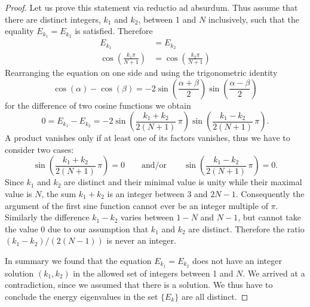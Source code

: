 \documentclass[a4paper,10pt]{article}
\begin{document}
\begin{proof}
    Let us prove this statement via reductio ad absurdum. Thus assume that there
    are distinct integers, $k_{1}$ and $k_{2}$, between 1 and $N$ inclusively,
    such that the equality $E_{k_{1}} = E_{k_{2}}$ is satisfied. Therefore
    \begin{align*}
        E_{k_{1}}
        &=
        E_{k_{2}}
        \\
        \cos{\!\left ( \frac{k_{1} \pi}{N+1} \right )}
        &=
        \cos{\!\left ( \frac{k_{2} \pi}{N+1} \right )}
    \end{align*}
    Rearranging the equation on one side and using the trigonometric identity
    \begin{equation*}
        \cos{\!(\alpha)} - \cos{\!(\beta)}
        =
        -2 \sin{\!\left ( \frac{\alpha+\beta}{2} \right )}
        \sin{\!\left ( \frac{\alpha - \beta}{2} \right )}
    \end{equation*}
    for the difference of two cosine functions we obtain
    \begin{equation*}
        0
        =
        E_{k_{1}} - E_{k_{2}}
        =
        -2
        \sin{\!\left ( \frac{k_{1} + k_{2}}{2(N+1)} \,\pi\right )}
        \sin{\!\left ( \frac{k_{1} - k_{2}}{2(N+1)} \,\pi\right )}.
    \end{equation*}
    A product vanishes only if at least one of its factors vanishes, thus we
    have to consider two cases:
    \begin{equation*}
        \sin{\!\left ( \frac{k_{1} + k_{2}}{2(N+1)} \,\pi\right )} = 0
        \qquad \text{and/or} \qquad
        \sin{\!\left ( \frac{k_{1} - k_{2}}{2(N+1)} \,\pi\right )} = 0.
    \end{equation*}
    Since $k_{1}$ and $k_{2}$ are distinct and their minimal value is unity
    while their maximal value is $N$, the sum $k_{1}+k_{2}$ is an integer
    between $3$ and $2N-1$. Consequently the argument of the first sine function
    cannot ever be an integer multiple of $\pi$. Similarly the difference $k_{1}
    - k_{2}$ varies between $1-N$ and $N-1$, but cannot take the value $0$ due
    to our assumption that $k_{1}$ and $k_{2}$ are distinct. Therefore the ratio
    $(k_{1}-k_{2})/(2(N-1))$ is never an integer.

    In summary we found that the equation $E_{k_{1}} = E_{k_{2}}$ does not
    have an integer solution $(k_{1}, k_{2})$ in the allowed set of integers
    between 1 and $N$. We arrived at a contradiction, since we assumed that
    there is a solution. We thus have to conclude the energy eigenvalues in the
    set $\lbrace E_{k} \rbrace$ are all distinct.
\end{proof}
\end{document}
